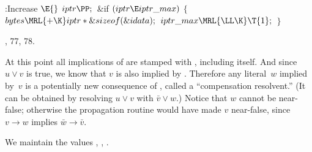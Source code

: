 \B{}:Increase \X${}\E{}$\6
$\\{iptr}\PP;{}$\6
\&{if} ${}(\\{iptr}\E\\{iptr\_max}){}$\5
${}\{{}$\1\6
${}\\{bytes}\MRL{+{\K}}\\{iptr}*\&{sizeof}(\&{idata});{}$\6
${}\\{iptr\_max}\MRL{{\LL}{\K}}\T{1};{}$\6
\4${}\}{}$\2\par
{}, 77, 78.\fi

At this point all implications of  are
stamped with ,
including  itself. And since $u\lor v$ is true, we know that
$v$ is also implied by . Therefore any literal~$w$ implied
by~$v$
is a potentially new consequence of , called a ``compensation
resolvent.'' (It can be obtained by resolving $u\lor v$ with $\bar v\lor w$.)
Notice that $w$ cannot be near-false; otherwise the propagation routine
would have made $v$ near-false, since $v\to w$ implies $\bar w\to\bar v$.

We maintain the values ,
, .

